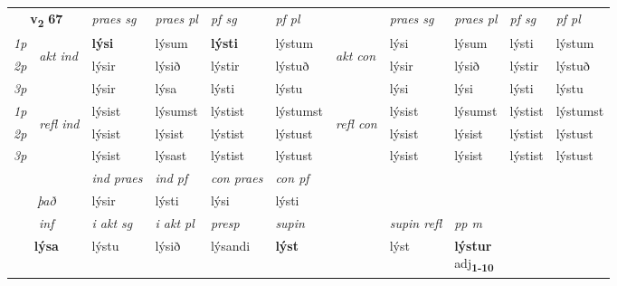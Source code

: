 \noindent
\begin{tabular}{lllllllllll} \toprule
\multicolumn{2}{c}{\textbf{v{\textsubscript{2}}} \Large{\textbf{67}}}  &  \textit{praes sg}  & \textit{praes pl}  &\textit{ pf sg} & \textit{pf pl} &  &  \textit{praes sg}  & \textit{praes pl}  & \textit{pf sg} & \textit{pf pl } \\*
	\cmidrule{3-6} \cmidrule{8-11}
 {\textit{1p}} & \multirow{3}{*}{\begin{turn}{90}\textit{akt ind}\end{turn}} & \textbf{lýsi} & lýsum & \textbf{lýsti} & lýstum & \multirow{3}{*}{\begin{turn}{90}\textit{akt con}\end{turn}} &lýsi & lýsum & lýsti & lýstum\\*
 {\textit{2p}} &  &  lýsir  & lýsið & lýstir & lýstuð & & lýsir & lýsið & lýstir & lýstuð \\*
{\textit{3p}} &  & lýsir & lýsa & lýsti & lýstu & & lýsi & lýsi& lýsti & lýstu \\*
\cmidrule{3-6} \cmidrule{8-11}
 {\textit{1p}} & \multirow{3}{*}{\begin{turn}{90}\textit{refl ind}\end{turn}}  & lýsist & lýsumst & lýstist & lýstumst & \multirow{3}{*}{\begin{turn}{90}\textit{refl con}\end{turn}}  &lýsist & lýsumst & lýstist & lýstumst \\*
 {\textit{2p}} &  & lýsist & lýsist & lýstist & lýstust & &lýsist & lýsist & lýstist & lýstust \\*
 {\textit{3p}}  & & lýsist & lýsast & lýstist & lýstust & & lýsist & lýsist& lýstist & lýstust \\*
\cmidrule{3-6} \cmidrule{8-11}

   & &  \textit{ind praes} & \textit{ind pf} & \textit{con praes} & \textit{con pf} \\*
\multicolumn{2}{c}{ \textit{það} } & lýsir & lýsti & lýsi & lýsti \\*

\cmidrule{3-9}
   \multicolumn{2}{c}{\textit{inf}}  & \textit{i akt sg} & \textit{i akt pl}   & \textit{presp} & \textit{supin} && \textit{supin refl} & \textit{pp m} \\*
  \multicolumn{2}{c}{\textbf{lýsa}} & lýstu  & lýsið   & lýsandi &  \textbf{lýst} && lýst & \specialcell{\textbf{lýstur} \\ adj\textbf{\textsubscript{1-10}}} \\*
\end{tabular}

